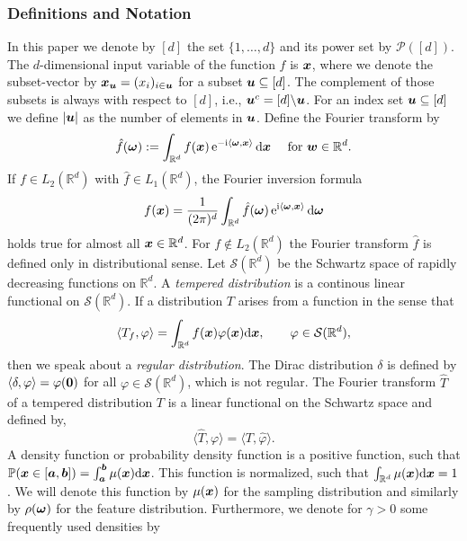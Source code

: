 \documentclass{article}
\renewcommand{\vec}[1]{\ensuremath \mathbf{\boldsymbol{#1}}}
\renewcommand{\phi}{\varphi}
\newcommand{\w}{\ensuremath{\vec \omega}}
\newcommand{\x}{\ensuremath{\vec x}}
\newcommand{\R}{\ensuremath{\mathbb{R}}}
\newcommand{\dx}{\mathrm{d}}
\newcommand{\e}{\mathrm{e}}
\newcommand{\im}{\mathrm{i}}
\renewcommand{\d}{\, \mathrm{d}}
\theoremstyle{definition}
\numberwithin{equation}{section}
\begin{document}
\subsubsection*{Definitions and Notation}
In this paper we denote by $[d]$ the set $\{1,\ldots,d\}$ and its power set by $\mathcal{P}([d])$. The $d$-dimensional input variable of the function $f$ is $\vec x$, where we denote the subset-vector by $\vec x_{\vec u}=(x_i)_{i\in \vec u}$ 
for a subset $\vec u\subseteq [d]$. The complement of those subsets is always with respect to $[d]$, i.e., $\vec u^c=[d]\backslash \vec u$.
For an index set $\vec u\subseteq [d]$ we define $|\vec u|$ as the number of elements in $\vec u$.
Define the Fourier transform by
\begin{equation}\label{eq:Fourier_R}
\hat{f}(\w):=\int_{\R^d}f(\vec x)\,\e^{-\im\langle\w,\vec x\rangle}\d \vec x \quad \text{ for } \vec w\in \R^d.
\end{equation}
If $f\in L_2(\R^d)$ with $\hat{f}\in L_1(\R^d)$, the Fourier inversion formula
\begin{equation}\label{eq:fourier_inv}
f(\vec x) = \frac{1}{(2\pi)^d}\int_{\R^d}\hat{f}(\vec \w)\, \e^{\im \langle \w,\vec x\rangle} \d \w
\end{equation}
holds true for almost all $\vec x\in \R^d$.
For $f\notin L_2(\R^d)$ the Fourier transform $\hat f$ is defined only in distributional sense. Let $\mathcal S(\R^d)$ be the Schwartz space of rapidly decreasing functions on $\R^d$. 
A \textit{tempered distribution} is a continous linear functional on $\mathcal S(\R^d)$. If a distribution $T$ arises from a function in the sense that 
$$\langle T_f ,\phi\rangle = \int_{\R^d} f(\x) \phi(\x) \dx \x, \qquad \phi \in \mathcal S(\R^d),$$
then we speak about a \textit{regular distribution}. %
The Dirac distribution $\delta$ is defined by $\langle \delta , \phi\rangle = \phi(\vec 0)$ for all $\phi\in \mathcal S(\R^d)$, which is not regular.
The Fourier transform $\hat T$ of a tempered distribution $T$ is a linear functional on the Schwartz space and defined by,
$$\langle \hat T, \phi \rangle = \langle T, \hat \phi\rangle.$$
A density function or probability density function is a positive function, such that $\mathbb P(\x \in [\vec a,\vec b]) = \int_{\vec a}^{\vec b} \mu(\x)\dx \x$. This function is normalized, such that $\int_{\R^d}\mu(\x) \dx \x = 1$. We will denote this function by $\mu(\x)$ for the sampling distribution and similarly by $\rho(\w)$ for the feature distribution. Furthermore, we denote for $\gamma>0$ some frequently used densities by
\end{document}
